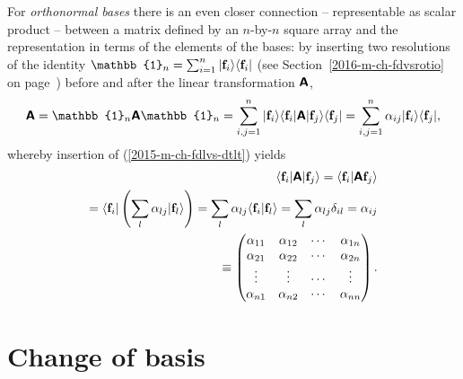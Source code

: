 For {\em orthonormal bases}
there is an even closer connection -- representable as scalar product -- between a matrix
defined by an $n$-by-$n$ square array and the representation in terms of the elements of the bases:
 by inserting
two resolutions of the identity
$\mathbb{1}_n = \sum_{i=1}^n
\vert {\bf f}_i\rangle \langle {\bf f}_i \vert$
(see Section~\ref{2016-m-ch-fdvsrotio} on page~\pageref{2016-m-ch-fdvsrotio}) before and after the
linear transformation $\textsf{\textbf{A}}$,
\begin{equation}
\textsf{\textbf{A}}  =
\mathbb{1}_n \textsf{\textbf{A}} \mathbb{1}_n  =
\sum_{i,j=1}^n
\vert {\bf f}_i\rangle \langle {\bf f}_i\vert \textsf{\textbf{A}}\vert {\bf f}_j\rangle \langle {\bf f}_j\vert  =
\sum_{i,j=1}^n \alpha_{ij}
\vert {\bf f}_i\rangle  \langle {\bf f}_j\vert,
\end{equation}
whereby  insertion of (\ref{2015-m-ch-fdlvs-dtlt}) yields
\begin{equation}
\begin{split}
 \langle {\bf f}_i \vert \textsf{\textbf{A}} \vert {\bf f}_j\rangle
= \langle {\bf f}_i \vert \textsf{\textbf{A}}   {\bf f}_j\rangle \\
= \langle {\bf f}_i \vert \left( \sum_l \alpha_{lj}\vert {\bf f}_l \rangle \right)
=  \sum_l \alpha_{lj} \langle {\bf f}_i \vert {\bf f}_l \rangle
=  \sum_l \alpha_{lj} \delta_{il}  = \alpha_{ij} \\
\equiv
\begin{pmatrix}
\alpha_{11}&
\alpha_{12}&
\cdots    &
\alpha_{1n}\\
\alpha_{21}&
\alpha_{22}&
\cdots    &
\alpha_{2n}\\
\vdots&
\vdots&
\cdots    &
\vdots\\
\alpha_{n1}&
\alpha_{n2}&
\cdots   &
\alpha_{nn}
\end{pmatrix}
.
\end{split}
\end{equation}









\section{Change of basis}
\label{2012-m-ch-fdlvs-changeofbasis}

